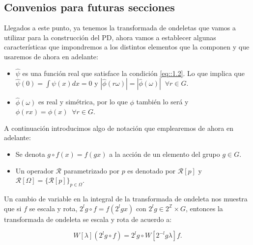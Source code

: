 \medskip


\subsection{Convenios para futuras secciones}

\noindent Llegados a este punto, ya tenemos la transformada de ondeletas que vamos a utilizar para la construcción del PD, ahora vamos a establecer algunas características que impondremos a los distintos elementos que la componen y que usaremos de ahora en adelante: 

\begin{itemize}
    \item $\widehat{\psi}$ es una función real que satisface la condición \eqref{eq::1.2}. Lo que implica que $\widehat{\psi}(0)=\int \psi(x)dx=0$ y $|\widehat{\phi}(r\omega)|=|\widehat{\phi}(\omega)| \;\; \forall r\in G$.
    \item $\widehat{\phi}(\omega)$ es real y simétrica, por lo que $\phi$ también lo será y $\phi(rx)=\phi(x) \;\; \forall r \in G$. 
\end{itemize}

\medskip

\noindent A continuación introducimos algo de notación que emplearemos de ahora en adelante: 

\begin{itemize}

  \item Se denota $g \circ f(x)=f(gx)$ a la acción de un elemento del grupo $g\in G$.
  \item Un operador  $\mathcal{R}$ parametrizado por $p$ es denotado por $\mathcal{R}[p]$ y $\mathcal{R}[\Omega]=\lbrace \mathcal{R}[p] \rbrace_{p \in \Omega}$. 
\end{itemize}

\noindent Un cambio de variable en la integral de la transformada de ondeleta nos muestra que si $f$ se escala y rota, $2^lg \circ f=f(2^lgx)$ con $2^lg \in 2^{\mathbb{Z}} \times G$, entonces la transformada de ondeleta se escala y rota de acuerdo a: 

\begin{equation}
  W[\lambda](2^lg\circ f)=2^lg \circ W[2^{-l}g\lambda]f.
\end{equation}

